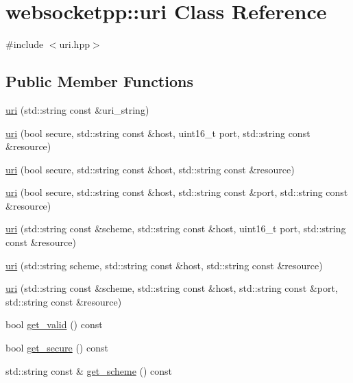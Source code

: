 \hypertarget{classwebsocketpp_1_1uri}{}\section{websocketpp\+:\+:uri Class Reference}
\label{classwebsocketpp_1_1uri}


{\ttfamily \#include $<$uri.\+hpp$>$}

\subsection*{Public Member Functions}
\begin{DoxyCompactItemize}
\item 
\hyperlink{classwebsocketpp_1_1uri_a8cb22ae92e3e49c4351a3f873a9b279d}{uri} (std\+::string const \&uri\+\_\+string)
\item 
\hyperlink{classwebsocketpp_1_1uri_a3c133d45cf2ebb1859e7113b2b9d44b3}{uri} (bool secure, std\+::string const \&host, uint16\+\_\+t port, std\+::string const \&resource)
\item 
\hyperlink{classwebsocketpp_1_1uri_ae7bfd18657c73695a4ff58318e02066a}{uri} (bool secure, std\+::string const \&host, std\+::string const \&resource)
\item 
\hyperlink{classwebsocketpp_1_1uri_a0d1197614a15afedca9fdfd1bfef3d85}{uri} (bool secure, std\+::string const \&host, std\+::string const \&port, std\+::string const \&resource)
\item 
\hyperlink{classwebsocketpp_1_1uri_a9019b4a2e3de42a822f2e37baa332c9e}{uri} (std\+::string const \&scheme, std\+::string const \&host, uint16\+\_\+t port, std\+::string const \&resource)
\item 
\hyperlink{classwebsocketpp_1_1uri_a2cf8998d357854ed3ce5fd8cb38742a5}{uri} (std\+::string scheme, std\+::string const \&host, std\+::string const \&resource)
\item 
\hyperlink{classwebsocketpp_1_1uri_a162349184bbc29a4d30f6fc50969e6e6}{uri} (std\+::string const \&scheme, std\+::string const \&host, std\+::string const \&port, std\+::string const \&resource)
\item 
bool \hyperlink{classwebsocketpp_1_1uri_af0fbbe278e9fe8ee5926f1a7903f31f9}{get\+\_\+valid} () const 
\item 
bool \hyperlink{classwebsocketpp_1_1uri_aab892e879dc0fca398cb1e1ef16b574d}{get\+\_\+secure} () const 
\item 
std\+::string const \& \hyperlink{classwebsocketpp_1_1uri_a16b5a63f97a50b49864e96d361810c88}{get\+\_\+scheme} () const 

\end{DoxyCompactItemize}
